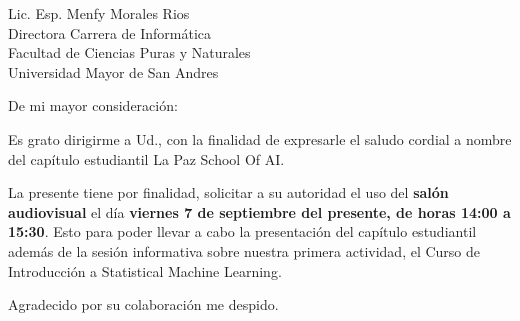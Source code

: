 \documentclass[12pt]{brownletter}
\date{5 de septiembre de 2018} %
\begin{document}
\begin{letter}{Lic. Esp. Menfy Morales Rios \\ 
               Directora Carrera de Informática \\ 
               Facultad de Ciencias Puras y Naturales\\ 
               Universidad Mayor de San Andres}

\opening{De mi mayor consideración:}


Es grato dirigirme a Ud., con la finalidad de expresarle el saludo cordial a nombre del capítulo estudiantil La Paz School Of AI.

La presente tiene por finalidad, solicitar a su autoridad el uso del \textbf{salón audiovisual} el día \textbf{viernes 7 de septiembre del presente, de horas 14:00 a 15:30}.  Esto para poder llevar a cabo la presentación del capítulo estudiantil además de la sesión informativa sobre nuestra primera actividad, el Curso de Introducción a Statistical Machine Learning.  



\closing{Agradecido por su colaboración me despido.}




\end{letter}
\end{document}
